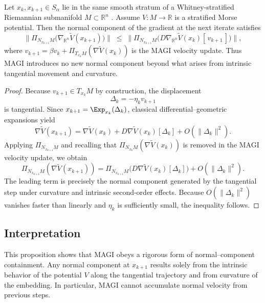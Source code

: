 \documentclass[12pt]{article}
\begin{document}
\begin{proposition}
\label{prop:normal-control}
Let $x_k, x_{k+1} \in S_\alpha$ lie in the same smooth stratum of a Whitney-stratified Riemannian submanifold $M \subset \mathbb{R}^n$ \citep{Whitney1965,GoreskyMacPherson1988}. Assume $V : M \to \mathbb{R}$ is a stratified Morse potential. Then the normal component of the gradient at the next iterate satisfies
\[
\big\| \Pi_{N_{x_{k+1}}M}\big(\nabla_{\mathbb{R}^n}\widetilde{V}(x_{k+1})\big) \big\|
\;\leq\;
\big\|
\Pi_{N_{x_{k+1}}M}\big(D\nabla_{\mathbb{R}^n} \widetilde{V}(x_k)[\,v_{k+1}\,]\big)
\big\|,
\]
where $v_{k+1} = \beta v_k + \Pi_{T_{x_k}M}(\nabla \widetilde{V}(x_k))$ is the MAGI velocity update. Thus MAGI introduces no new normal component beyond what arises from intrinsic tangential movement and curvature.
\end{proposition}

\begin{proof}
Because $v_{k+1} \in T_{x_k}M$ by construction, the displacement
\[
\Delta_k = -\eta_k v_{k+1}
\]
is tangential. Since $x_{k+1} = \Exp_{x_k}(\Delta_k)$, classical differential–geometric expansions \citep{CheegerEbin1975,Jost2011} yield
\[
\nabla \widetilde{V}(x_{k+1})
=
\nabla \widetilde{V}(x_k)
+
D\nabla \widetilde{V}(x_k)[\Delta_k]
+
O(\|\Delta_k\|^2).
\]
Applying $\Pi_{N_{x_{k+1}}M}$ and recalling that $\Pi_{N_{x_k}M}(\nabla \widetilde{V}(x_k))$ is removed in the MAGI velocity update, we obtain
\[
\Pi_{N_{x_{k+1}}M}(\nabla \widetilde{V}(x_{k+1}))
=
\Pi_{N_{x_{k+1}}M}\big( D\nabla \widetilde{V}(x_k)[\Delta_k] \big)
+ O(\|\Delta_k\|^2).
\]
The leading term is precisely the normal component generated by the tangential step under curvature and intrinsic second-order effects. Because $O(\|\Delta_k\|^2)$ vanishes faster than linearly and $\eta_k$ is sufficiently small, the inequality follows.
\end{proof}

\subsection*{Interpretation}

This proposition shows that MAGI obeys a rigorous form of normal–component containment. Any normal component at $x_{k+1}$ results solely from the intrinsic behavior of the potential $V$ along the tangential trajectory and from curvature of the embedding. In particular, MAGI cannot accumulate normal velocity from previous steps.
\end{document}
